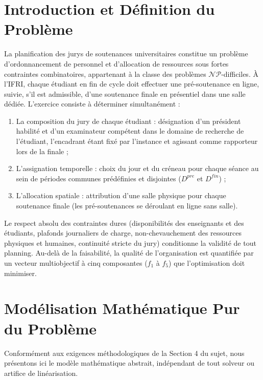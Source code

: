 \documentclass[10pt,a4paper]{article}
\begin{document}
\vspace{0.2cm}
\tableofcontents
\vspace{0.4cm}

\section{Introduction et Définition du Problème}

La planification des jurys de soutenances universitaires constitue un problème d'ordonnancement de personnel et d'allocation de ressources sous fortes contraintes combinatoires, appartenant à la classe des problèmes $\mathcal{NP}$-difficiles. À l'IFRI, chaque étudiant en fin de cycle doit effectuer une pré-soutenance en ligne, suivie, s'il est admissible, d'une soutenance finale en présentiel dans une salle dédiée. L'exercice consiste à déterminer simultanément :
\begin{enumerate}
    \item La composition du jury de chaque étudiant : désignation d'un président habilité et d'un examinateur compétent dans le domaine de recherche de l'étudiant, l'encadrant étant fixé par l'instance et agissant comme rapporteur lors de la finale ;
    \item L'assignation temporelle : choix du jour et du créneau pour chaque séance au sein de périodes communes prédéfinies et disjointes ($D^{pre}$ et $D^{fin}$) ;
    \item L'allocation spatiale : attribution d'une salle physique pour chaque soutenance finale (les pré-soutenances se déroulant en ligne sans salle).
\end{enumerate}
Le respect absolu des contraintes dures (disponibilités des enseignants et des étudiants, plafonds journaliers de charge, non-chevauchement des ressources physiques et humaines, continuité stricte du jury) conditionne la validité de tout planning. Au-delà de la faisabilité, la qualité de l'organisation est quantifiée par un vecteur multiobjectif à cinq composantes ($f_1$ à $f_5$) que l'optimisation doit minimiser.

\section{Modélisation Mathématique Pur du Problème}

Conformément aux exigences méthodologiques de la Section 4 du sujet, nous présentons ici le modèle mathématique abstrait, indépendant de tout solveur ou artifice de linéarisation.
\end{document}
